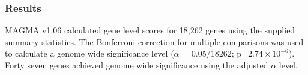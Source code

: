 









\subsubsection{Results }
MAGMA v1.06 calculated gene level scores for 18,262 genes using the supplied summary statistics.
The Bonferroni correction for multiple comparisons was used to calculate a genome wide significance level ($\alpha$ = 0.05/18262; p=$2.74 \times 10^{-6}$). Forty seven genes achieved genome wide significance using the adjusted $\alpha$ level.


